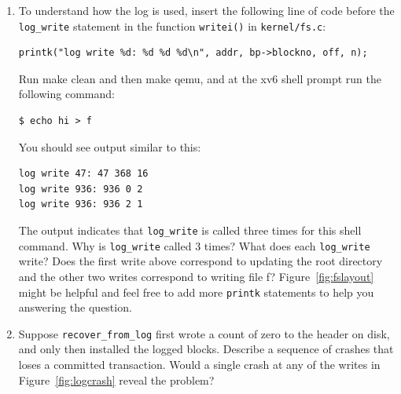 \begin{enumerate}

  \item To understand how the log is used, insert the following line
    of code before the \lstinline{log_write} statement in the function
    \lstinline{writei()} in \lstinline{kernel/fs.c}:

\begin{verbatim}
printk("log write %d: %d %d %d\n", addr, bp->blockno, off, n);
\end{verbatim}

Run make clean and then make qemu, and at the xv6 shell prompt run the following command:
\begin{verbatim}
$ echo hi > f
\end{verbatim}

You should see output similar to this:
\begin{verbatim}
log write 47: 47 368 16
log write 936: 936 0 2
log write 936: 936 2 1
\end{verbatim}

The output indicates that \lstinline{log_write} is called three times
for this shell command. Why is \lstinline{log_write} called 3 times? What does
each \lstinline{log_write} write? Does the first write above correspond to
updating the root directory and the other two writes correspond to
writing file f?  Figure~\ref{fig:fslayout} might be helpful and feel
free to add more \lstinline{printk} statements to help you answering
the question.

  \item Suppose
    \lstinline{recover_from_log}
    first wrote a count of zero to the header on disk, and only then
    installed the logged blocks.
    Describe a sequence of crashes that loses a committed transaction.
    Would a single crash at any of the writes in
    Figure~\ref{fig:logcrash}
    reveal the problem?

\end{enumerate}
